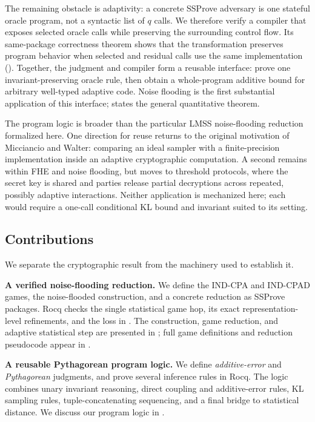 The remaining obstacle is adaptivity: a concrete SSProve adversary is one stateful oracle program, not a syntactic list of \(q\) calls.
We therefore verify a compiler that exposes selected oracle calls while
preserving the surrounding control flow.  Its same-package correctness theorem
shows that the transformation preserves program behavior when selected and
residual calls use the same implementation ().
Together, the judgment and compiler form a reusable interface: prove one
invariant-preserving oracle rule, then obtain a whole-program additive bound
for arbitrary well-typed adaptive code.
Noise flooding is the first substantial application of this interface;
 states the general quantitative theorem.

The program logic is broader than the particular LMSS noise-flooding reduction
formalized here.
One direction for reuse returns to the original motivation of Micciancio and
Walter: comparing an ideal sampler with a finite-precision implementation inside
an adaptive cryptographic computation.
A second remains within FHE and noise flooding, but moves to threshold
protocols, where the secret key is shared and parties release partial
decryptions across repeated, possibly adaptive interactions.
Neither application is mechanized here; each would require a one-call
conditional KL bound and invariant suited to its setting.

\subsection{Contributions}

We separate the cryptographic result from the machinery used to establish it.

\textbf{A verified noise-flooding reduction.} We define the IND-CPA and IND-CPAD games, the noise-flooded construction, and a concrete reduction as SSProve packages.
Rocq checks the single statistical game hop, its exact representation-level
refinements, and the loss in .
The construction, game reduction, and adaptive statistical step are presented
in ; full game
definitions and reduction pseudocode appear in .

\textbf{A reusable Pythagorean program logic.}
We define \emph{additive-error} and \emph{Pythagorean} judgments, and prove
several inference rules in Rocq.
The logic combines unary invariant reasoning,
direct coupling and additive-error rules, KL sampling rules, tuple-concatenating
sequencing, and a final bridge to statistical distance.
We discuss our program logic in .

